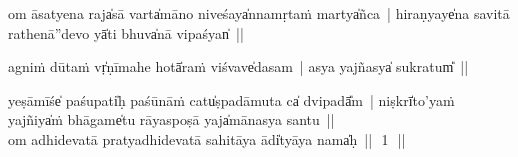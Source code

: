 \documentclass[parskip, DIV=14]{scrartcl}
\begin{document}

\vspace{0.5cm}


om āsa॒tyena॒ raja̍sā॒॒ varta̍māno nive॒॒śaya̍nna॒mṛta॒ṁ martya̍ñca~| %
hi॒ra॒ṇyaye̍na savi॒tā rathe॒॒nā''de॒॒vo yā̍ti॒ bhuva̍nā vi॒paśyan̍~||
 

a॒gniṁ dū॒taṁ vṛ̍ṇīmahe॒॒ hotā̍raṁ vi॒śvave̍dasam~| 
a॒sya ya॒jñasya̍ su॒kratum̎~||


yeṣā॒॒mīśe̍ paśu॒pati̍ḥ paśū॒nāṁ catu̍ṣpadāmu॒ta ca̍ dvi॒padā̎m~| 
niṣkrī̍to॒’yaṁ ya॒jñiya̍ṁ bhā॒॒game̍tu rā॒॒yaspoṣā॒॒ yaja̍mānasya santu~||\\


om adhidevatā pratyadhidevatā sahitāya ādi̍tyāya॒ nama̍ḥ~||~\,1\,~||

\vspace{0.5cm}
\newpage
\end{document}
